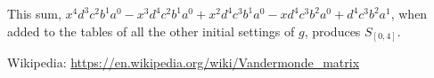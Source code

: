 \documentclass[11pt, oneside]{article} 	%
\begin{document}
This sum, $x^4d^3c^2b^1a^0-x^3d^4c^2b^1a^0+x^2d^4c^3b^1a^0-xd^4c^3b^2a^0+d^4c^3b^2a^1$, when added to the tables of all the other initial settings of $g$, produces $S_{[0,4]}$.


\begin{thebibliography}{9}
Wikipedia: \url{https://en.wikipedia.org/wiki/Vandermonde_matrix}
\end{thebibliography}
\end{document}
